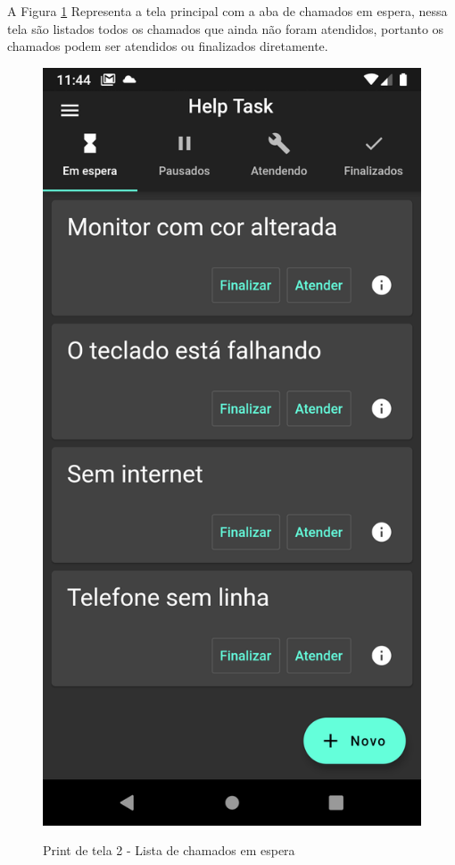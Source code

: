 A Figura \ref{fig:2_em_espera} Representa a tela principal com a aba de chamados em espera, nessa tela são listados todos os chamados que ainda não foram atendidos, portanto os chamados podem ser atendidos ou finalizados diretamente.
\begin{figure}[htb]
     \caption{Print de tela 2 - Lista de chamados em espera}
     \centering
     \begin{frame}{
     \includegraphics [scale = 0.2]{img/screenshots/2_em_espera.png}}
     \end{frame}
     \label{fig:2_em_espera}
 \end{figure}
\newpage

